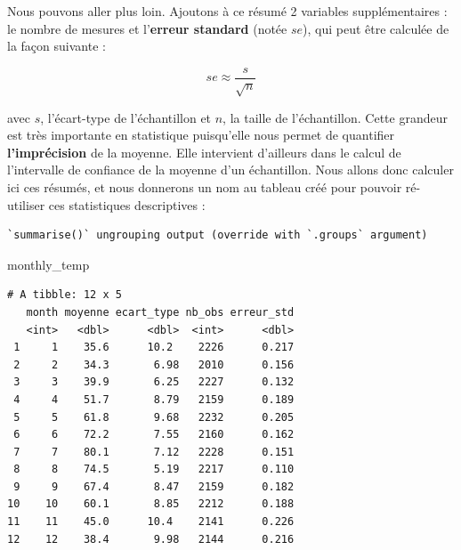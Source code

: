 \documentclass[
  a4paper,
]{article}
\newenvironment{Shaded}{\begin{snugshade}}{\end{snugshade}}
\newcommand{\DataTypeTok}[1]{\textcolor[rgb]{0.00,0.34,0.68}{#1}}
\newcommand{\KeywordTok}[1]{\textcolor[rgb]{0.12,0.11,0.11}{\textbf{#1}}}
\newcommand{\NormalTok}[1]{\textcolor[rgb]{0.12,0.11,0.11}{#1}}
\newcommand{\OperatorTok}[1]{\textcolor[rgb]{0.12,0.11,0.11}{#1}}
\newcommand{\OtherTok}[1]{\textcolor[rgb]{0.00,0.43,0.16}{#1}}
\newcommand{\StringTok}[1]{\textcolor[rgb]{0.75,0.01,0.01}{#1}}
\begin{document}
Nous pouvons aller plus loin. Ajoutons à ce résumé 2 variables supplémentaires : le nombre de mesures et l'\textbf{erreur standard} (notée \(se\)), qui peut être calculée de la façon suivante :

\[se \approx \frac{s}{\sqrt{n}}\]

avec \(s\), l'écart-type de l'échantillon et \(n\), la taille de l'échantillon. Cette grandeur est très importante en statistique puisqu'elle nous permet de quantifier \textbf{l'imprécision} de la moyenne. Elle intervient d'ailleurs dans le calcul de l'intervalle de confiance de la moyenne d'un échantillon. Nous allons donc calculer ici ces résumés, et nous donnerons un nom au tableau créé pour pouvoir ré-utiliser ces statistiques descriptives :

\begin{Shaded}
\end{Shaded}

\begin{verbatim}
`summarise()` ungrouping output (override with `.groups` argument)
\end{verbatim}

\begin{Shaded}
\begin{Highlighting}[]
\NormalTok{monthly_temp}
\end{Highlighting}
\end{Shaded}

\begin{verbatim}
# A tibble: 12 x 5
   month moyenne ecart_type nb_obs erreur_std
   <int>   <dbl>      <dbl>  <int>      <dbl>
 1     1    35.6      10.2    2226      0.217
 2     2    34.3       6.98   2010      0.156
 3     3    39.9       6.25   2227      0.132
 4     4    51.7       8.79   2159      0.189
 5     5    61.8       9.68   2232      0.205
 6     6    72.2       7.55   2160      0.162
 7     7    80.1       7.12   2228      0.151
 8     8    74.5       5.19   2217      0.110
 9     9    67.4       8.47   2159      0.182
10    10    60.1       8.85   2212      0.188
11    11    45.0      10.4    2141      0.226
12    12    38.4       9.98   2144      0.216
\end{verbatim}
\end{document}
